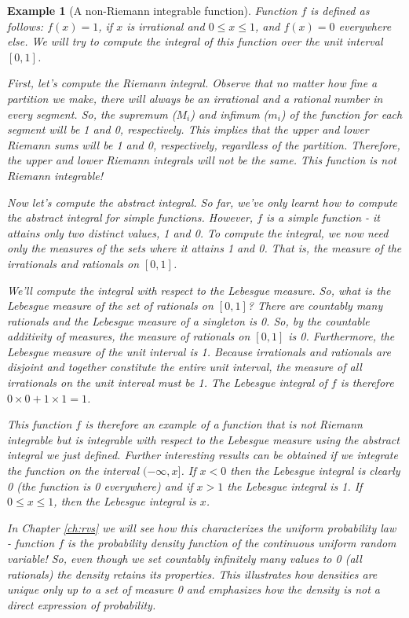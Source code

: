 \documentclass{book}
\theoremstyle{plain}%
\newtheorem{prototheorem}{Example}[section]
\newenvironment{cexample}
   {\colorlet{shadecolor}{gray!10}\begin{shaded}\begin{prototheorem}}
   {\end{prototheorem}\end{shaded}}
\theoremstyle{definition}
\begin{document}
\begin{cexample}[A non-Riemann integrable function]
Function $f$ is defined as follows: $f(x) = 1$, if $x$ is irrational and $0 \leq x \leq 1$, and $f(x) = 0$ everywhere else. We will try to compute the integral of this function over the unit interval $[0,1]$.

First, let's compute the Riemann integral. Observe that no matter how fine a partition we make, there will always be an irrational and a rational number in every segment. So, the supremum ($M_i$) and infimum ($m_i$) of the function for each segment will be 1 and 0, respectively. This implies that the upper and lower Riemann sums will be 1 and 0, respectively, regardless of the partition. Therefore, the upper and lower Riemann integrals will not be the same. This function is not Riemann integrable!

Now let's compute the abstract integral. So far, we've only learnt how to compute the abstract integral for simple functions. However, $f$ is a simple function - it attains only two distinct values, 1 and 0. To compute the integral, we now need only the measures of the sets where it attains 1 and 0. That is, the measure of the irrationals and rationals on $[0,1]$.

We'll compute the integral with respect to the Lebesgue measure. So, what is the Lebesgue measure of the set of rationals on $[0,1]$? There are countably many rationals and the Lebesgue measure of a singleton is 0. So, by the countable additivity of measures, the measure of rationals on $[0,1]$ is 0. Furthermore, the Lebesgue measure of the unit interval is 1. Because irrationals and rationals are disjoint and together constitute the entire unit interval, the measure of all irrationals on the unit interval must be 1. The Lebesgue integral of $f$ is therefore $0 \times 0 + 1 \times 1 = 1$.

This function $f$ is therefore an example of a function that is not Riemann integrable but is integrable with respect to the Lebesgue measure using the abstract integral we just defined. Further interesting results can be obtained if we integrate the function on the interval $(-\infty, x]$. If $x < 0$ then the Lebesgue integral is clearly 0 (the function is 0 everywhere) and if $x > 1$ the Lebesgue integral is 1. If $0 \leq x \leq 1$, then the Lebesgue integral is $x$.

In Chapter \ref{ch:rvs} we will see how this characterizes the uniform probability law - function $f$ is the probability density function of the continuous uniform random variable! So, even though we set countably infinitely many values to 0 (all rationals) the density retains its properties. This illustrates how densities are unique only up to a set of measure 0 and emphasizes how the density is not a direct expression of probability.\label{ex:dirichlet}
\end{cexample}
\end{document}
